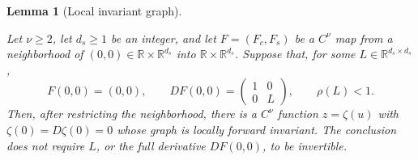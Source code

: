\documentclass[11pt]{article}
\newtheorem{lemma}[theorem]{Lemma}
\newcommand{\R}{\mathbb R}
\begin{document}
\begin{lemma}[Local invariant graph]\label{lem:graph-transform}


Let $\nu\ge2$, let $d_s\ge1$ be an integer, and let $F=(F_c,F_s)$ be a
$C^\nu$ map from a neighborhood of $(0,0)\in\R\times\R^{d_s}$ into
$\R\times\R^{d_s}$.  Suppose that, for some
$L\in\R^{d_s\times d_s}$,
\[
F(0,0)=(0,0),\qquad
DF(0,0)=\begin{pmatrix}1&0\\0&L\end{pmatrix},
\qquad \rho(L)<1.
\]
Then, after restricting the neighborhood, there is a $C^\nu$ function
$z=\zeta(u)$ with $\zeta(0)=D\zeta(0)=0$ whose graph is locally forward
invariant.  The conclusion does not require $L$, or the full derivative
$DF(0,0)$, to be invertible.
\end{lemma}
\end{document}
